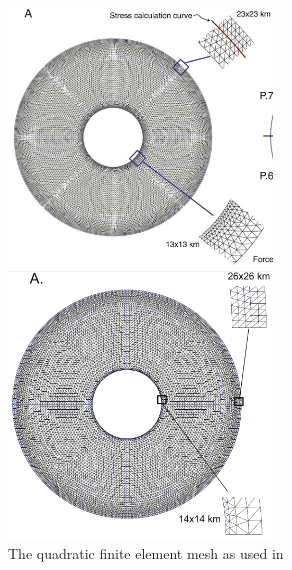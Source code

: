 \begin{center}
\includegraphics[width=7cm]{images/meshes/brhv08}
\includegraphics[width=7cm]{images/meshes/brva07a}\\
{\scriptsize The quadratic finite element mesh as used in \cite{brhv08,brva07a}}
\end{center}




